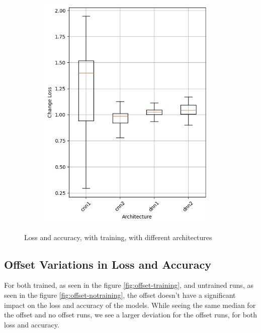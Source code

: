 \begin{figure}
\begin{subfigure}{0.5\textwidth}
        \includegraphics[width=0.95\textwidth]{plots/Architecture_Trained_loss.png}
    \end{subfigure}
    \caption{Loss and accuracy, with training, with different architectures}
    \label{fig:architecture-training}
\end{figure}
\subsection{Offset Variations in Loss and Accuracy}\label{subsec:offset-variations-in-loss-and-accuracy}
For both trained, as seen in the figure \ref{fig:offset-training}, and untrained runs, as seen in the figure \ref{fig:offset-notraining}, the offset doesn't have a significant impact on the loss and accuracy of the models.
While seeing the same median for the offset and no offset runs, we see a larger deviation for the offset runs, for both loss and accuracy.

